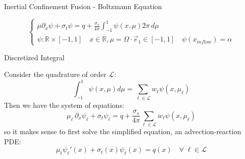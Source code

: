 \documentclass{beamer}
\newcommand{\R}{{\mathbb R}}
\theoremstyle{plain}
\theoremstyle{definition}
\begin{document}
\begin{frame}{Inertial Confinement Fusion - Boltzmann Equation}
\begin{center}
\end{center}
\vspace{-0.3cm}
\[
\begin{cases}
    \mu \partial_x \psi + \sigma_t \psi = q+\frac{\sigma_s}{4\pi}\int_{-1}^1\psi(x,\mu)2\pi \,d\mu \\ 
    \psi:\R\times[-1,1] \quad x\in\R,\mu=\Omega\cdot \vec e_1\in[-1,1]\quad \psi(x_{inflow}) = \alpha
    
\end{cases}
\]
\end{frame}

\begin{frame}{Discretized Integral}

    Consider the quadrature of order $\mathcal{L}$: 
    \[\int_{-1}^1\psi(x,\mu)d\mu=\sum_{\ell\in\mathcal{L}}w_\ell \psi(x,\mu_\ell)\]
    Then we have the system of equations:
    \[\mu_\ell\,\partial_x\psi_\ell+\sigma_t \psi_\ell=q+ \frac{\sigma_s}{4\pi } \sum_{\ell \in\mathcal{L}}w_\ell \psi(x,\mu_\ell)\]
    so it makes sense to first solve the simplified equation, an advection-reaction PDE:
    \[\mu_\ell \psi_\ell'(x)+\sigma_t(x) \psi_\ell(x)=q(x) \quad \forall\;\ell \in \mathcal L \]
\end{frame}
\end{document}
